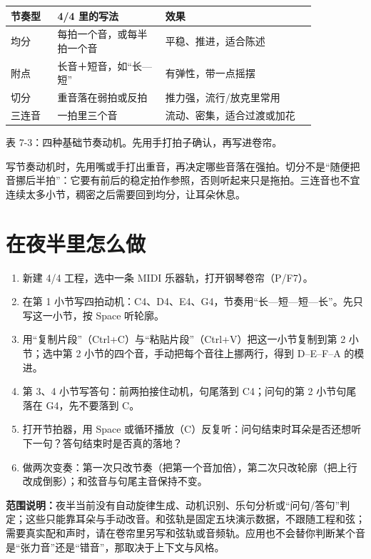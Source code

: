 \begin{center}
\small
\begin{tabular}{p{0.13\linewidth}p{0.30\linewidth}p{0.42\linewidth}}
\toprule
节奏型 & 4/4 里的写法 & 效果 \\
\midrule
均分 & 每拍一个音，或每半拍一个音 & 平稳、推进，适合陈述 \\
附点 & 长音＋短音，如“长—短” & 有弹性，带一点摇摆 \\
切分 & 重音落在弱拍或反拍 & 推力强，流行/放克里常用 \\
三连音 & 一拍里三个音 & 流动、密集，适合过渡或加花 \\
\bottomrule
\end{tabular}

表 7-3：四种基础节奏动机。先用手打拍子确认，再写进卷帘。
\end{center}

写节奏动机时，先用嘴或手打出重音，再决定哪些音落在强拍。切分不是“随便把音挪后半拍”：它要有前后的稳定拍作参照，否则听起来只是拖拍。三连音也不宜连续太多小节，稠密之后需要回到均分，让耳朵休息。

\section{在夜半里怎么做}

\begin{enumerate}
  \item 新建 4/4 工程，选中一条 MIDI 乐器轨，打开钢琴卷帘（P/F7）。
  \item 在第 1 小节写四拍动机：C4、D4、E4、G4，节奏用“长—短—短—长”。先只写这一小节，按 Space 听轮廓。
  \item 用“复制片段”（Ctrl+C）与“粘贴片段”（Ctrl+V）把这一小节复制到第 2 小节；选中第 2 小节的四个音，手动把每个音往上挪两行，得到 D–E–F–A 的模进。
  \item 第 3、4 小节写答句：前两拍接住动机，句尾落到 C4；问句的第 2 小节句尾落在 G4，先不要落到 C。
  \item 打开节拍器，用 Space 或循环播放（C）反复听：问句结束时耳朵是否还想听下一句？答句结束时是否真的落地？
  \item 做两次变奏：第一次只改节奏（把第一个音加倍），第二次只改轮廓（把上行改成倒影）；和弦音与句尾主音保持不变。
\end{enumerate}


\textbf{范围说明：}夜半当前没有自动旋律生成、动机识别、乐句分析或“问句/答句”判定；这些只能靠耳朵与手动改音。和弦轨是固定五块演示数据，不跟随工程和弦；需要真实配和声时，请在卷帘里另写和弦轨或音频轨。应用也不会替你判断某个音是“张力音”还是“错音”，那取决于上下文与风格。

